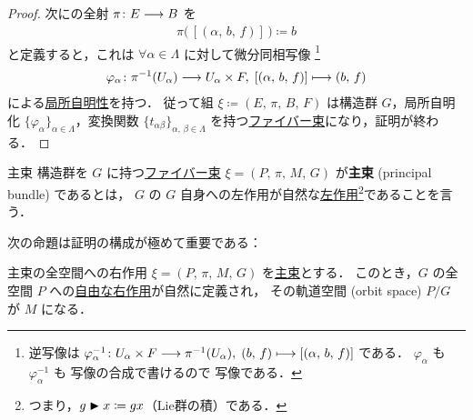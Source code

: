 \documentclass[TQFT_main]{subfiles}
\begin{document}
\begin{proof}
	次に\cinfty の全射 $\pi \colon E \longrightarrow B$ を
	\begin{align}
		\pi \bigl(\, [(\alpha,\, b,\, f)]\, \bigr) \coloneqq b
	\end{align}
	と定義すると，これは $\forall \alpha \in \Lambda$ に対して微分同相写像
    \footnote{
        逆写像は $\varphi_\alpha^{-1} \colon U_\alpha \times F \longrightarrow \pi^{-1}(U_\alpha),\; (b,\, f) \longmapsto [(\alpha,\, b,\, f)]$ である．
        $\varphi_\alpha$ も $\varphi_\alpha^{-1}$ も \cinfty 写像の合成で書けるので \cinfty 写像である．
    }
	\begin{align}
		\varphi_\alpha \colon \pi^{-1}(U_\alpha) \longrightarrow U_\alpha \times F,\; [(\alpha,\, b,\, f)] \longmapsto (b,\, f)
	\end{align}
	による\hyperref[fig.bundle_homo]{局所自明性}を持つ．
	従って組 $\xi \coloneqq (E,\, \pi,\, B,\, F)$ は構造群 $G$，局所自明化 $\{\varphi_\alpha\}_{\alpha \in \Lambda}$，変換関数 $\{t_{\alpha\beta}\}_{\alpha,\, \beta \in \Lambda}$ を持つ\hyperref[def.fiber-1]{ファイバー束}になり，証明が終わる．
\end{proof}

\begin{mydef}[label=def.PFD]{主束}
    構造群を $G$ に持つ\hyperref[def.fiber-1]{ファイバー束} $\xi = (P,\, \pi,\, M,\, G)$ が\textbf{主束} (principal bundle) であるとは，
    $G$ の $G$ 自身への左作用が自然な\hyperref[def:Lie-action]{左作用}\footnote{つまり，$g \blacktriangleright x \coloneqq gx$（Lie群の積）である．}であることを言う．
\end{mydef}

次の命題は証明の構成が極めて重要である：
\begin{myprop}[label=prop.PFD_right]{主束の全空間への右作用}
	$\xi = (P,\, \pi,\, M,\, G)$ を\hyperref[def.PFD]{主束}とする．
    このとき，$G$ の全空間 $P$ への\hyperref[def:Lie-action]{自由な右作用}が自然に定義され，
	その軌道空間 (orbit space) $P/G$ が $M$ になる．
\end{myprop}
\end{document}
